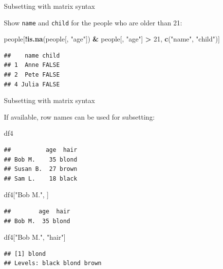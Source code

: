 \documentclass[ignorenonframetext,]{beamer}
\newenvironment{Shaded}{\begin{snugshade}}{\end{snugshade}}
\newcommand{\DecValTok}[1]{\textcolor[rgb]{0.00,0.00,0.81}{#1}}
\newcommand{\KeywordTok}[1]{\textcolor[rgb]{0.13,0.29,0.53}{\textbf{#1}}}
\newcommand{\NormalTok}[1]{#1}
\newcommand{\OperatorTok}[1]{\textcolor[rgb]{0.81,0.36,0.00}{\textbf{#1}}}
\newcommand{\StringTok}[1]{\textcolor[rgb]{0.31,0.60,0.02}{#1}}
\begin{document}
\begin{frame}[fragile]{Subsetting with matrix syntax}
\protect\hypertarget{subsetting-with-matrix-syntax-5}{}

Show \texttt{name} and \texttt{child} for the people who are older than
21:

\begin{Shaded}
\begin{Highlighting}[]
\NormalTok{people[}\OperatorTok{!}\KeywordTok{is.na}\NormalTok{(people[, }\StringTok{"age"}\NormalTok{]) }\OperatorTok{&}\StringTok{ }\NormalTok{people[, }\StringTok{"age"}\NormalTok{] }\OperatorTok{>}\StringTok{ }\DecValTok{21}\NormalTok{,}
       \KeywordTok{c}\NormalTok{(}\StringTok{"name"}\NormalTok{, }\StringTok{"child"}\NormalTok{)]}
\end{Highlighting}
\end{Shaded}

\begin{verbatim}
##    name child
## 1  Anne FALSE
## 2  Pete FALSE
## 4 Julia FALSE
\end{verbatim}

\end{frame}

\begin{frame}[fragile]{Subsetting with matrix syntax}
\protect\hypertarget{subsetting-with-matrix-syntax-6}{}

If available, row names can be used for subsetting:

\begin{Shaded}
\begin{Highlighting}[]
\NormalTok{df4}
\end{Highlighting}
\end{Shaded}

\begin{verbatim}
##          age  hair
## Bob M.    35 blond
## Susan B.  27 brown
## Sam L.    18 black
\end{verbatim}

\begin{Shaded}
\begin{Highlighting}[]
\NormalTok{df4[}\StringTok{"Bob M."}\NormalTok{, ]}
\end{Highlighting}
\end{Shaded}

\begin{verbatim}
##        age  hair
## Bob M.  35 blond
\end{verbatim}

\begin{Shaded}
\begin{Highlighting}[]
\NormalTok{df4[}\StringTok{"Bob M."}\NormalTok{, }\StringTok{"hair"}\NormalTok{]}
\end{Highlighting}
\end{Shaded}

\begin{verbatim}
## [1] blond
## Levels: black blond brown
\end{verbatim}

\end{frame}
\end{document}
